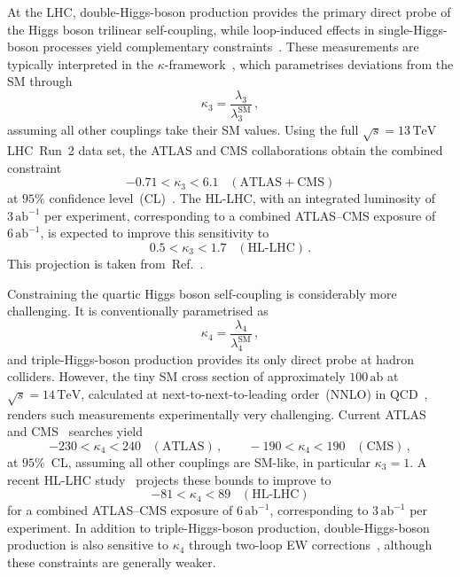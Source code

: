 \documentclass{SciPost}
\def\beq{\begin{equation}}
\def\eeq{\end{equation}}
\begin{document}
At the LHC, double-Higgs-boson production provides the primary direct probe of the Higgs boson trilinear self-coupling, while loop-induced effects in single-Higgs-boson processes yield complementary constraints~\cite{Gorbahn:2016uoy,Degrassi:2016wml,Bizon:2016wgr,Maltoni:2017ims,Gorbahn:2019lwq,Haisch:2021hvy,Gao:2023bll,Haisch:2024nzv,Ghosh:2025fma}. These measurements are typically interpreted in the $\kappa$-framework~\cite{LHCHiggsCrossSectionWorkingGroup:2012nn,LHCHiggsCrossSectionWorkingGroup:2013rie,LHCHiggsCrossSectionWorkingGroup:2016ypw}, which parametrises deviations from the SM through
\beq \label{eq:kappa3}
\kappa_3 = \frac{\lambda_3}{\lambda_3^{\mathrm{SM}}} \,,
\eeq
assuming all other couplings take their SM values. Using the full $\sqrt{s}=13\,\mathrm{TeV}$ LHC~Run~2 data set, the ATLAS and CMS collaborations obtain the combined constraint
\beq \label{eq:kappa3bound}
-0.71 < \kappa_3 < 6.1\;\;\;(\text{ATLAS}+\text{CMS})
\eeq
at $95\%$ confidence level~(CL)~\cite{CMS:2026nuu}. The HL-LHC, with an integrated luminosity of $3\,\mathrm{ab}^{-1}$ per experiment, corresponding to a combined ATLAS--CMS exposure of $6\,\mathrm{ab}^{-1}$, is expected to improve this sensitivity to
\beq
0.5 < \kappa_3 < 1.7\;\;\;(\text{HL-LHC})\,.
\eeq
This projection is taken from~Ref.~\cite{ATL-PHYS-PUB-2025-018}.

Constraining the quartic Higgs boson self-coupling is considerably more challenging. It is conventionally parametrised as
\beq \label{eq:kappa4}
\kappa_4 = \frac{\lambda_4}{\lambda_4^{\mathrm{SM}}} \,,
\eeq
and triple-Higgs-boson production provides its only direct probe at hadron colliders. However, the tiny SM cross section of approximately $100\,\mathrm{ab}$ at $\sqrt{s}=14\,\mathrm{TeV}$, calculated at next-to-next-to-leading order~(NNLO) in QCD~\cite{deFlorian:2019app}, renders such measurements experimentally very challenging. Current ATLAS~\cite{ATLAS:2024xcs} and CMS~\cite{CMS-PAS-HIG-24-012} searches yield
\beq \label{eq:kappa4bounds}
-230 < \kappa_4 < 240 \;\;\;(\text{ATLAS}) \,, \qquad
-190 < \kappa_4 < 190 \;\;\;(\text{CMS}) \,,
\eeq
at $95\%$~CL, assuming all other couplings are SM-like, in particular $\kappa_3=1$. A recent HL-LHC study~\cite{Ding:2026qto} projects these bounds to improve to
\beq \label{eq:kappa4boundsHL}
-81 < \kappa_4 < 89\;\;\;(\text{HL-LHC})
\eeq
for a combined ATLAS--CMS exposure of $6\,\mathrm{ab}^{-1}$, corresponding to $3\,\mathrm{ab}^{-1}$ per experiment. In addition to triple-Higgs-boson production, double-Higgs-boson production is also sensitive to $\kappa_4$ through two-loop EW corrections~\cite{Bizon:2018syu,Borowka:2018pxx,Li:2024iio,Ding:2026qto}, although these constraints are generally weaker.
\end{document}

